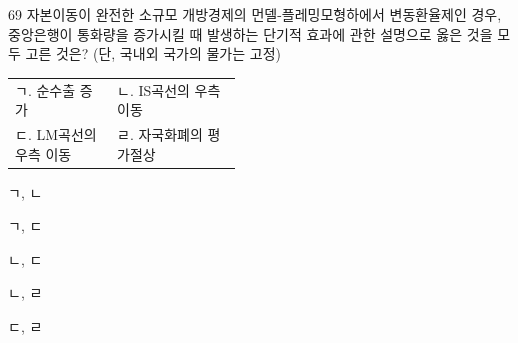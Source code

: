 \begin{question}{69}
자본이동이 완전한 소규모 개방경제의 먼델-플레밍모형하에서 변동환율제인 경우, 중앙은행이 통화량을 증가시킬 때 발생하는 단기적 효과에 관한 설명으로 옳은 것을 모두 고른 것은? (단, 국내외 국가의 물가는 고정)
\begin{framedtext}
\begin{tabular}{@{}p{0.45\linewidth}l@{}}
ㄱ. 순수출 증가 & ㄴ. IS곡선의 우측 이동 \\
ㄷ. LM곡선의 우측 이동 & ㄹ. 자국화폐의 평가절상
\end{tabular}
\end{framedtext}
\begin{choices}
  \item ㄱ, ㄴ
  \item ㄱ, ㄷ
  \item ㄴ, ㄷ
  \item ㄴ, ㄹ
  \item ㄷ, ㄹ
\end{choices}
\end{question}
\answerall
{}
